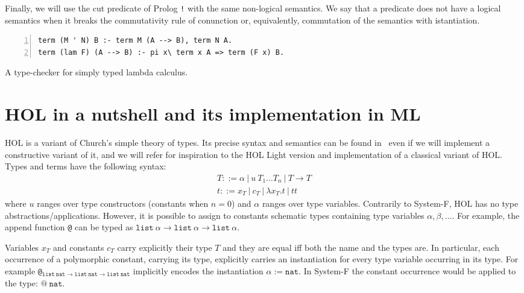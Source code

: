 \documentclass[preprint]{sigplanconf}
\begin{document}
Finally, we will use the cut predicate of Prolog \texttt{!} with the same
non-logical semantics. We say that a predicate does not have a logical semantics
when it breaks the commutativity rule of conunction or, equivalently, commutation of the semantics with istantiation.

\begin{table}[t]
\begin{small}
\begin{Verbatim}[numbers=left,numbersep=1pt,frame=leftline]
term (M ' N) B :- term M (A --> B), term N A.
term (lam F) (A --> B) :- pi x\ term x A => term (F x) B.
\end{Verbatim}
\end{small}
\caption{\label{type-checker1}A type-checker for simply typed lambda calculus.}
\end{table}

\section{HOL in a nutshell and its implementation in ML}
HOL is a variant of Church's simple theory of types. Its precise syntax and semantics can be found in~\cite{the_HOL_system_LOGIC} even if we will implement a constructive variant of it, and we will refer for inspiration to the HOL Light version and implementation of a classical variant of HOL. Types and terms have the
following syntax:
$$\begin{array}{l}
T ::= \alpha ~|~ u~T_1\ldots T_n ~|~ T \rightarrow T\\
t ::= x_T ~|~ c_T ~|~ \lambda x_T. t ~|~ tt
\end{array}$$
where $u$ ranges over type constructors (constants when $n=0$) and $\alpha$
ranges over type variables. Contrarily to System-F,%
HOL has no type
abstractions/applications. However, it is possible to assign to constants
schematic types containing type variables $\alpha, \beta, \ldots$. For example,
the append function \texttt{@} can be typed as $\mathtt{list}~\alpha \rightarrow \mathtt{list}~\alpha \rightarrow \mathtt{list}~\alpha$.

Variables $x_T$ and constants $c_T$ carry explicitly their type $T$ and they are equal iff both the name and the types are. In particular, each occurrence of a polymorphic constant, carrying its type, explicitly carries an instantiation for every type variable occurring in its type. For example
\texttt{@}$_{\mathtt{list}~\mathtt{nat} \rightarrow \mathtt{list}~\mathtt{nat} \rightarrow \mathtt{list}~\mathtt{nat}}$ implicitly encodes the instantiation $\alpha := \mathtt{nat}$. In System-F the constant occurrence would be applied to the type: $\texttt{@}~\mathtt{nat}$.
\end{document}
